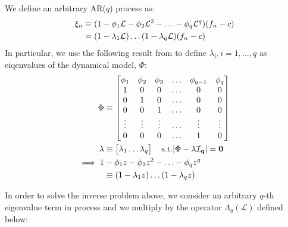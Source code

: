 We define an arbitrary AR($q$) process as:
\begin{align}
\xi_n & \equiv (1 - \phi_1 \mathcal{L}  - \phi_2 \mathcal{L} ^2 - \hdots -\phi_q \mathcal{L} ^q) (f_n - c)\\
& = (1 - \lambda_1 \mathcal{L}) \hdots (1 - \lambda_q \mathcal{L}) (f_n - c) \label{eqn:app:ARMA:ar_p_1}
\end{align}
In particular, we use the following result from \cite{hamilton1994time} to define $\lambda_i, i = 1, \hdots, q$ as eiqenvalues of the dynamical model, $\Phi$:
\begin{align}
\Phi &\equiv \begin{bmatrix} \phi_1 & \phi_2 & \phi_3 & \hdots & \phi_{q-1}  &\phi_q \\
1 & 0 & 0 & \hdots & 0 & 0 \\
0 & 1 & 0 & \hdots & 0 & 0 \\
0 & 0 & 1 & \hdots & 0 & 0 \\
\vdots & \vdots & \vdots & \hdots & \vdots & \vdots \\
0 & 0 & 0 & \hdots & 1 & 0 \\
 \end{bmatrix} \\
\bf{\lambda} & \equiv \begin{bmatrix} \lambda_1 \dots \lambda_q \end{bmatrix} \quad \text{s.t.} |\Phi - \bf{\lambda}\mathcal{I}_q|  = 0 \\
\implies 1 & - \phi_1 z  - \phi_2 z^2 - \hdots -\phi_q z^q \\
&\equiv (1 - \lambda_1z) \hdots (1 - \lambda_q z) 
\end{align}

In order to solve the inverse problem above, we consider an arbitrary $q$-th eigenvalue term in  process and we multiply by the operator $\Lambda_q(\mathcal{L}) $ defined below:

